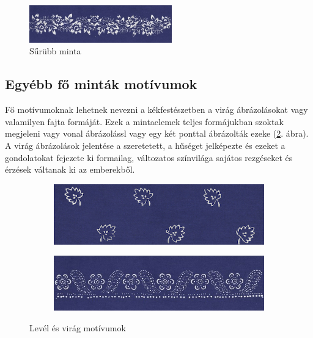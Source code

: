 \documentclass[fontsize=12pt, appendixprefix=true]{scrreprt}
\begin{document}
\begin{figure}[h!]
	\centering
	\includegraphics[width=0.55\textwidth]{img/sürübb minta.jpg}
	\caption{Sűrübb minta}
	\label{fig:suruminta}
\end{figure}

\subsection{Egyébb fő minták motívumok}
Fő motívumoknak lehetnek nevezni a kékfestészetben a virág ábrázolásokat vagy valamilyen fajta formáját.  
Ezek a mintaelemek teljes formájukban szoktak megjeleni vagy vonal ábrázolássl vagy egy két ponttal ábrázolták ezeke (\ref{fig:levelvirag}. ábra).
A virág ábrázolások jelentése a szeretetett, a hűséget jelképezte és  ezeket a gondolatokat fejezete ki formailag, változatos színvilága sajátos rezgéseket és érzések váltanak ki az emberekből.

\begin{figure}[h!]
	\centering
	\begin{subfigure}[b]{0.4\linewidth}
	  \includegraphics[width=\linewidth]{img/levél01.png}
	  \caption{}
	\end{subfigure}
	\begin{subfigure}[b]{0.43\linewidth}
	  \includegraphics[width=\linewidth]{img/virág 01.jpg}
	  \caption{}
	\end{subfigure}
	\caption{Levél és virág motívumok}
	\label{fig:levelvirag}
  \end{figure}
\end{document}
